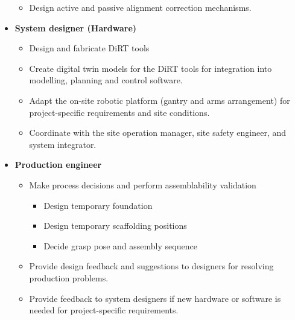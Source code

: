 \begin{itemize}
\begin{itemize}
		\item Design active and passive alignment correction mechanisms. 

	\end{itemize}
	\item \textbf{System designer (Hardware)}

	\begin{itemize}
		\item Design and fabricate DiRT tools

		\item Create digital twin models for the DiRT tools for integration into modelling, planning and control software. 

		\item Adapt the on-site robotic platform (gantry and arms arrangement) for project-specific requirements and site conditions. 

		\item Coordinate with the site operation manager, site safety engineer, and system integrator.

	\end{itemize}
	\item \textbf{Production engineer}

	\begin{itemize}
		\item Make process decisions and perform assemblability validation

		\begin{itemize}
			\item Design temporary foundation 

			\item Design temporary scaffolding positions 

			\item Decide grasp pose and assembly sequence 

		\end{itemize}
		\item Provide design feedback and suggestions to designers for resolving production problems.

		\item Provide feedback to system designers if new hardware or software is needed for project-specific requirements.


\end{itemize}
\end{itemize}
